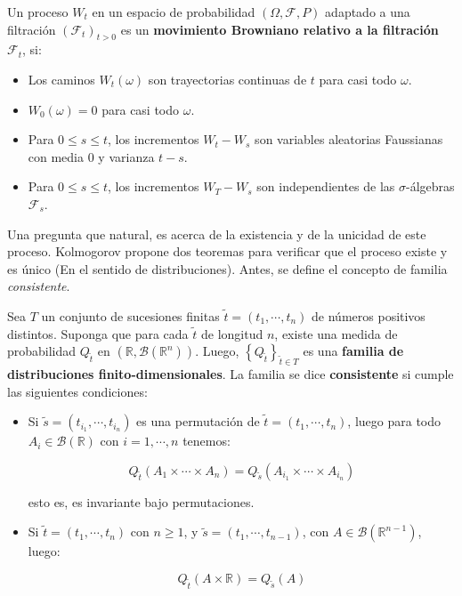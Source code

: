 \begin{boxDef}
	Un proceso $W_t$ en un espacio de probabilidad $(\Omega,\mathcal{F}, P)$ adaptado a una filtración $(\mathcal{F}_t)_{t > 0}$ es un \textbf{movimiento Browniano relativo a la filtración} $\mathcal{F}_t$, si:

	\begin{itemize}
		\item Los caminos $W_t(\omega)$ son trayectorias continuas de $t$ para casi todo $\omega$.
		\item $W_0 (\omega) = 0$ para casi todo $\omega$.
		\item Para $0 \leq s \leq t$, los incrementos $W_t - W_s$ son variables aleatorias Faussianas con media $0$ y varianza $t - s$.
		\item Para $0 \leq s \leq t$, los incrementos $W_T - W_s$ son independientes de las $\sigma$-álgebras $\mathcal{F}_s$.
	\end{itemize}

\end{boxDef}

Una pregunta que natural, es acerca de la existencia y de la unicidad de este proceso. Kolmogorov propone dos teoremas para verificar que el proceso existe y es único (En el sentido de distribuciones). Antes, se define el concepto de familia \textit{consistente}.

\begin{boxDef}
	Sea $T$ un conjunto de sucesiones finitas $\tilde{t} = (t_1, \cdots, t_n)$ de números positivos distintos. Suponga que para cada $\tilde{t}$ de longitud $n$, existe una medida de probabilidad $Q_{\tilde{t}}$ en $(\mathbb{R}, \mathcal{B}(\mathbb{R}^n))$. Luego, $\left\{ Q_{\tilde{t}} \right\}_{\tilde{t} \in T}$ es una \textbf{familia de distribuciones finito-dimensionales}. La familia se dice \textbf{consistente} si cumple las siguientes condiciones:

	\begin{itemize}
		\item Si $\tilde{s} = (t_{i_1}, \cdots, t_{i_n})$ es una permutación de $\tilde{t} = (t_1, \cdots, t_n)$, luego para todo $A_i \in \mathcal{B}(\mathbb{R})$ con $i = 1, \cdots, n$ tenemos:

		\[
			Q_{\tilde{t}} (A_1 \times \cdots \times A_n) = Q_{\tilde{s}} (A_{i_1} \times \cdots \times A_{i_n})
		\]

		esto es, es invariante bajo permutaciones.

		\item Si $\tilde{t} = (t_1, \cdots, t_n)$ con $n \geq 1$, y $\tilde{s} = (t_1, \cdots, t_{n-1})$, con $A \in \mathcal{B}(\mathbb{R}^{n-1})$, luego:

		\[
			Q_{\tilde{t}} (A \times \mathbb{R}) = Q_{\tilde{s}} (A)
		\]
	\end{itemize}

\end{boxDef}

